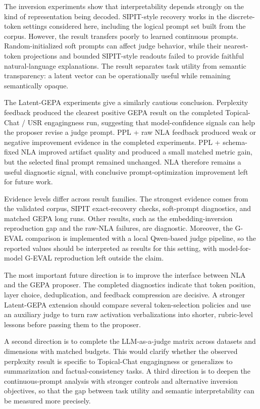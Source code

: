 \documentclass[12pt,a4paper,twoside,openright]{book}
\begin{document}
The inversion experiments show that interpretability depends strongly on the
kind of representation being decoded. SIPIT-style recovery works in the
discrete-token settings considered here, including the logical prompt
set built from the corpus. However, the result transfers poorly to learned
continuous prompts. Random-initialized soft prompts can affect judge behavior,
while their nearest-token projections and bounded SIPIT-style readouts failed
to provide faithful natural-language explanations. The result separates task
utility from semantic transparency: a latent vector can be operationally useful
while remaining semantically opaque.

The Latent-GEPA experiments give a similarly cautious conclusion. Perplexity
feedback produced the clearest positive GEPA result on the completed
Topical-Chat / USR engagingness run, suggesting that model-confidence signals
can help the proposer revise a judge prompt. PPL + raw NLA feedback produced
weak or negative improvement evidence in the completed experiments.
PPL + schema-fixed NLA improved artifact quality and produced a small matched
metric gain, but the selected final prompt remained unchanged. NLA therefore
remains a useful diagnostic signal, with conclusive prompt-optimization
improvement left for future work.

Evidence levels differ across result families. The strongest evidence comes from
the validated corpus, SIPIT exact-recovery checks, soft-prompt diagnostics, and
matched GEPA long runs. Other results, such as the embedding-inversion
reproduction gap and the raw-NLA failures, are diagnostic. Moreover, the G-EVAL
comparison is implemented with a local Qwen-based judge pipeline, so the reported
values should be interpreted as results for this setting, with model-for-model
G-EVAL reproduction left outside the claim.

The most important future direction is to improve the interface between NLA and
the GEPA proposer. The completed diagnostics indicate that token position,
layer choice, deduplication, and feedback compression are decisive. A stronger
Latent-GEPA extension should compare several token-selection policies and use an
auxiliary judge to turn raw activation verbalizations into shorter,
rubric-level lessons before passing them to the proposer.

A second direction is to complete the LLM-as-a-judge matrix across datasets and
dimensions with matched budgets. This would clarify whether the observed
perplexity result is specific to Topical-Chat engagingness or generalizes to
summarization and factual-consistency tasks. A third direction is to deepen the
continuous-prompt analysis with stronger controls and alternative inversion
objectives, so that the gap between task utility and semantic interpretability
can be measured more precisely.
\end{document}
